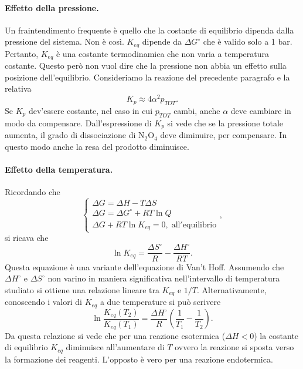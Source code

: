 \paragraph{Effetto della pressione.} Un fraintendimento frequente è quello che la costante di equilibrio dipenda dalla pressione del sistema. Non
è così. $K_{eq}$ dipende da $\Delta G^\circ$ che è valido solo a 1 bar. Pertanto, $K_{eq}$ è una costante termodinamica
che non varia a temperatura costante. Questo però non vuol dire che la pressione non abbia un effetto sulla
posizione dell'equilibrio. Consideriamo la reazione del precedente paragrafo e la relativa
\begin{equation}
    K_p\approx4\alpha^2p_{TOT}.
\end{equation}
Se $K_p$ dev'essere costante, nel caso in cui $p_{TOT}$ cambi, anche $\alpha$ deve cambiare in modo da compensare. Dall'espressione di $K_p$ si vede che se la pressione totale aumenta, il grado di dissociazione di $\text{N}_2\text{O}_4$  deve diminuire, per compensare. In questo modo anche
la resa del prodotto diminuisce.
\paragraph{Effetto della temperatura.} Ricordando che
\begin{equation}
    \begin{cases}
        \Delta G=\Delta H-T\Delta S \\
        \Delta G=\Delta G^\circ+RT\ln{Q} \\
        \Delta G+RT\ln{K_{eq}}=0,\; \mathrm{all'equilibrio}
    \end{cases},
\end{equation}
si ricava che
\begin{equation}
    \ln{K_{eq}}=\frac{\Delta S^\circ}{R}-\frac{\Delta H^\circ}{RT}.
\end{equation}
Questa equazione è una variante dell'equazione di Van't Hoff. Assumendo che $\Delta H^\circ$ e $\Delta S^\circ$ non varino in maniera significativa nell'intervallo di temperatura studiato si ottiene una relazione lineare tra $K_{eq}$ e $1/T$. Alternativamente, conoscendo i valori di $K_{eq}$ a due temperature si può scrivere
\begin{equation}
    \ln{\frac{K_{eq}\left(T_2\right)}{K_{eq}\left(T_1\right)}}=\frac{\Delta H^\circ}{R}\left(\frac{1}{T_1}-\frac{1}{T_2}\right).
\end{equation}
Da questa relazione si vede che per una reazione esotermica ($\Delta H<0$) la costante di equilibrio $K_{eq}$ diminuisce
all'aumentare di $T$ ovvero la reazione si sposta verso la formazione dei reagenti. L'opposto è vero per una reazione endotermica.

